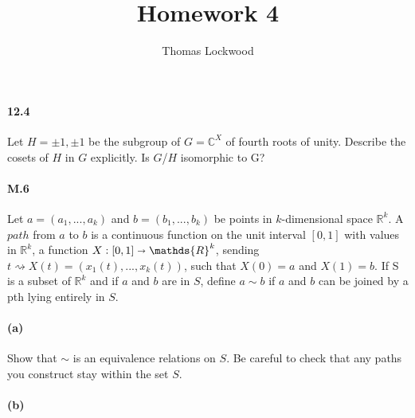 \documentclass[12pt, oneside]{article}   	%
\title{Homework 4}
\author{Thomas Lockwood}
\date{}							%
\begin{document}
\maketitle{}
\paragraph{12.4}
Let $H = ${$\pm{1}, \pm{1}$} be the subgroup of $G = \mathds{C}^X$ of fourth roots of unity. Describe the cosets of $H$ in $G$ explicitly. Is $G$/$H$ isomorphic to G?

\paragraph{M.6}
Let $a = (a_1,...,a_k)$ and $ b = (b_1,...,b_k)$ be points in $k$-dimensional space $\mathds{R}^k$. A $path$ from $a$ to $b$ is a continuous function on the unit interval $[0,1]$ with values in $\mathds{R}^k$, a function $X:[0,1]\shortrightarrow\mathds{R}^k$, sending $t\rightsquigarrow X(t) = (x_1(t),...,x_k(t))$, such that $X(0) = a$ and $X(1) = b$. If S is a subset of $\mathds{R}^k$ and if $a$ and $b$ are in $S$, define $a \sim b$ if $a$ and $b$ can be joined by a pth lying entirely in $S$.
\paragraph{(a)}
Show that $\sim$ is an equivalence relations on $S$. Be careful to check that any paths you construct stay within the set $S$.
\paragraph{(b)}
\end{document}
